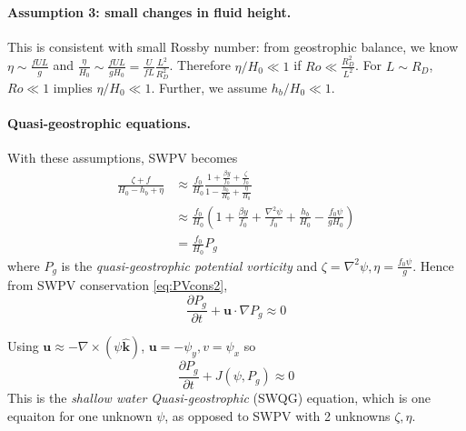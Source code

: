 \documentclass{jknotes}
\newcommand{\Ro}{Ro}
\begin{document}
\paragraph{Assumption 3: small changes in fluid height.}
This is consistent with small Rossby number: from geostrophic balance, we know
$\eta \sim \frac{f UL}{g}$ and $\frac{\eta}{H_0} \sim \frac{fUL}{gH_0} =
\frac{U}{fL} \frac{L^2}{R_D^2}$. Therefore $\eta/H_0 \ll 1$ if $\Ro \ll
\frac{R^2_D}{L^2}$. For $L \sim R_D$, $\Ro \ll 1$ implies $\eta/H_0 \ll 1$.
Further, we assume $h_b/H_0 \ll 1$. 

\paragraph{Quasi-geostrophic equations.} With these assumptions, SWPV becomes
\begin{align}
	\frac{\zeta + f}{H_0 - h_b + \eta} &\approx \frac{f_0}{H_0} \frac{1+
		\frac{\beta y}{f_0} + \frac{\zeta}{f_0}}{1 - \frac{h_b}{H_0} +
	\frac{\eta}{H_0}} \\
	&\approx \frac{f_0}{H_0} \left(1+\frac{\beta y}{f_0} + \frac{\nabla^2
\psi}{f_0} + \frac{h_b}{H_0} - \frac{f_0 \psi}{g H_0}\right) \\
&= \frac{f_0}{H_0} P_g
\end{align}
where $P_g$ is the \emph{quasi-geostrophic potential vorticity} and $\zeta =
\nabla^2 \psi, \eta = \frac{f_0 \psi}{g}$. Hence from SWPV conservation
\eqref{eq:PVcons2},
\begin{equation}
	\frac{\partial P_g}{\partial t} + \bm{u} \cdot \nabla P_g \approx 0
\end{equation}

Using $\bm{u} \approx - \nabla \times (\psi \hat{\bm{k}})$, $\bm{u} = -\psi_y,
v = \psi_x$ so
\begin{equation}
	\frac{\partial P_g}{\partial t} + J(\psi,P_g) \approx 0\label{eq:swqg}
\end{equation}
This is the \emph{shallow water Quasi-geostrophic} (SWQG) equation, which is
one equaiton for one unknown $\psi$, as opposed to SWPV with 2 unknowns
$\zeta, \eta$.
\end{document}
